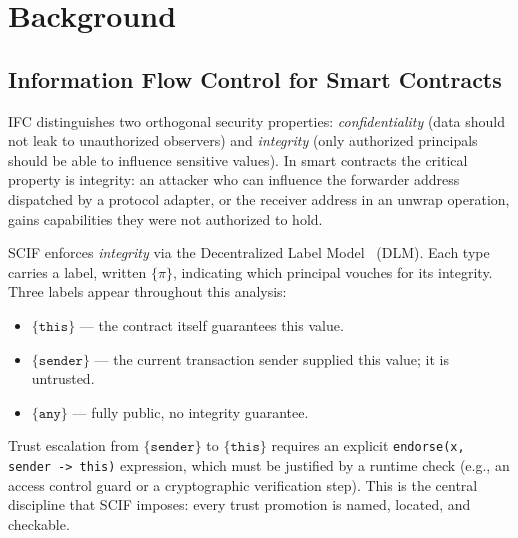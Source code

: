\documentclass[11pt,a4paper]{article}
\begin{document}
\section{Background}
\label{sec:background}

\subsection{Information Flow Control for Smart Contracts}

IFC distinguishes two orthogonal security properties: \emph{confidentiality}
(data should not leak to unauthorized observers) and \emph{integrity} (only
authorized principals should be able to influence sensitive values). In smart
contracts the critical property is integrity: an attacker who can influence the
forwarder address dispatched by a protocol adapter, or the receiver address in
an unwrap operation, gains capabilities they were not authorized to hold.

SCIF enforces \emph{integrity} via the Decentralized Label
Model~\cite{myers1997sosp} (DLM). Each type carries a label, written $\{\pi\}$,
indicating which principal vouches for its integrity. Three labels appear
throughout this analysis:
\begin{itemize}
  \item $\{\texttt{this}\}$ --- the contract itself guarantees this value.
  \item $\{\texttt{sender}\}$ --- the current transaction sender supplied this
    value; it is untrusted.
  \item $\{\texttt{any}\}$ --- fully public, no integrity guarantee.
\end{itemize}
Trust escalation from $\{\texttt{sender}\}$ to $\{\texttt{this}\}$ requires an
explicit \texttt{endorse(x, sender -> this)} expression, which must be
justified by a runtime check (e.g., an access control guard or a cryptographic
verification step). This is the central discipline that SCIF imposes: every
trust promotion is named, located, and checkable.
\end{document}
